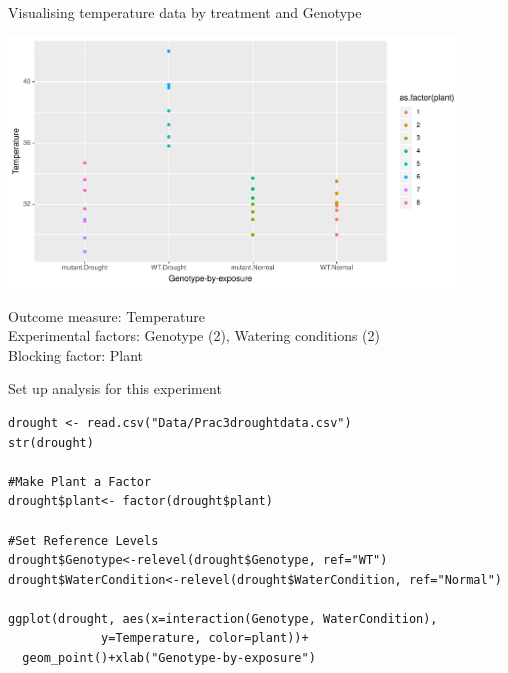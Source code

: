 \documentclass[10pt]{beamer}
\makeatletter
\newenvironment{kframe}{%
 \def\at@end@of@kframe{}%
 \ifinner\ifhmode%
  \def\at@end@of@kframe{\end{minipage}}%
  \begin{minipage}{\columnwidth}%
 \fi\fi%
 \def\FrameCommand##1{\hskip\@totalleftmargin \hskip-\fboxsep
 \colorbox{shadecolor}{##1}\hskip-\fboxsep
     \hskip-\linewidth \hskip-\@totalleftmargin \hskip\columnwidth}%
 \MakeFramed {\advance\hsize-\width
   \@totalleftmargin\z@ \linewidth\hsize
   \@setminipage}}%
 {\par\unskip\endMakeFramed%
 \at@end@of@kframe}
\newenvironment{knitrout}{}{} %
\makeatother
\begin{document}
\begin{frame}{Visualising temperature data by treatment and Genotype}
 \begin{center}
 \includegraphics[width=0.9\textwidth]{Figures/droughtdata}
 \end{center}
 Outcome measure: Temperature\\
Experimental factors: Genotype (2), Watering conditions (2)\\
Blocking factor: Plant 
\end{frame}

\begin{frame}[fragile]{Set up analysis for this experiment}
 \begin{knitrout}
 \footnotesize
{}\color{fgcolor}\begin{kframe}
\begin{verbatim}
drought <- read.csv("Data/Prac3droughtdata.csv")
str(drought)

#Make Plant a Factor
drought$plant<- factor(drought$plant)

#Set Reference Levels
drought$Genotype<-relevel(drought$Genotype, ref="WT")
drought$WaterCondition<-relevel(drought$WaterCondition, ref="Normal")

ggplot(drought, aes(x=interaction(Genotype, WaterCondition),
		     y=Temperature, color=plant))+
  geom_point()+xlab("Genotype-by-exposure")
\end{verbatim}
\end{kframe}
\end{knitrout}

\end{frame}
\end{document}
